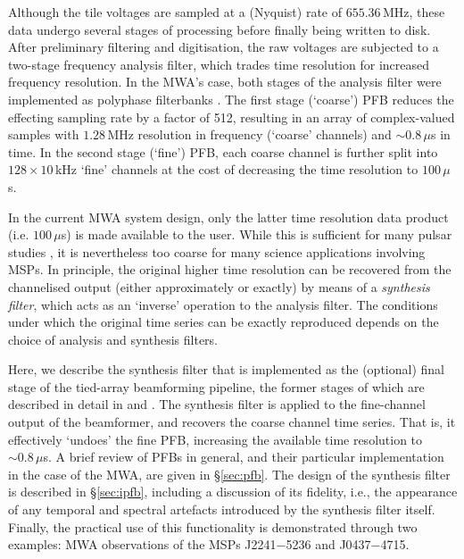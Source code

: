 \documentclass{pasa}%
\begin{document}
Although the tile voltages are sampled at a (Nyquist) rate of $655.36\,$MHz, these data undergo several stages of processing before finally being written to disk.
After preliminary filtering and digitisation, the raw voltages are subjected to a two-stage frequency analysis filter, which trades time resolution for increased frequency resolution.
In the MWA's case, both stages of the analysis filter were implemented as polyphase filterbanks \citep[PFBs;][\dots]{Harris2011,Prabu2015}.
The first stage (`coarse') PFB reduces the effecting sampling rate by a factor of 512, resulting in an array of complex-valued samples with $1.28\,$MHz resolution in frequency (`coarse' channels) and $\sim0.8\,\mu$s in time.
In the second stage (`fine') PFB, each coarse channel is further split into $128 \times 10\,$kHz `fine' channels at the cost of decreasing the time resolution to $100\,\mu$s.

In the current MWA system design, only the latter time resolution data product (i.e. $100\,\mu$s) is made available to the user.
While this is sufficient for many pulsar studies \citep[e.g.][]{Oronsaye2015,McSweeney2017,Bhat2018}, it is nevertheless too coarse for many science applications involving MSPs.
In principle, the original higher time resolution can be recovered from the channelised output (either approximately or exactly) by means of a \textit{synthesis filter}, which acts as an `inverse' operation to the analysis filter.
The conditions under which the original time series can be exactly reproduced depends on the choice of analysis and synthesis filters.

Here, we describe the synthesis filter that is implemented as the (optional) final stage of the tied-array beamforming pipeline, the former stages of which are described in detail in \citet[][hereafter Paper I]{Ord2019} and \citet[][hereafter Paper II]{Xue2019}.
The synthesis filter is applied to the fine-channel output of the beamformer, and recovers the coarse channel time series.
That is, it effectively `undoes' the fine PFB, increasing the available time resolution to $\sim 0.8\,\mu$s.
A brief review of PFBs in general, and their particular implementation in the case of the MWA, are given in \S\ref{sec:pfb}.
The design of the synthesis filter is described in \S\ref{sec:ipfb}, including a discussion of its fidelity, i.e., the appearance of any temporal and spectral artefacts introduced by the synthesis filter itself.
Finally, the practical use of this functionality is demonstrated through two examples: MWA observations of the MSPs J2241$-$5236 and J0437$-$4715.
\end{document}
